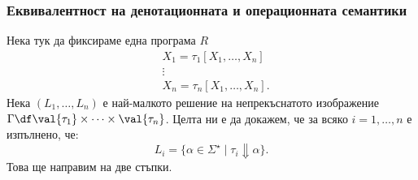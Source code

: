 




\subsubsection{Еквивалентност на денотационната и операционната семантики}

Нека тук да фиксираме една програма $R$
\begin{align*}
  & X_1 = \tau_1[X_1,\dots,X_n]\\
    & \vdots\\
  & X_n = \tau_n[X_1,\dots,X_n].
\end{align*}
Нека $(L_1,\dots,L_n)$ е най-малкото решение на непрекъснатото изображение $\Gamma \df \val{\tau_1}\times \cdots \times \val{\tau_n}$. Целта ни е да докажем, че за всяко $i = 1,\dots,n$ е изпълнено, че:
\[L_i = \{\alpha \in \Sigma^\star \mid \tau_i \Downarrow \alpha\}.\]
Това ще направим на две стъпки.


